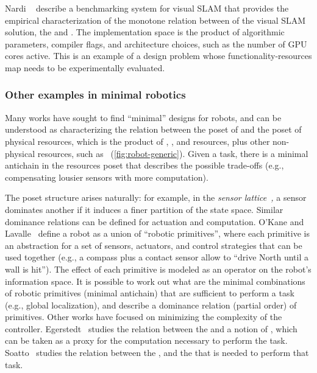 \begin{example}
Nardi\,\,\etal~\cite{zia16comparative} describe a benchmarking
system for visual SLAM that provides the empirical characterization
of the monotone relation between  of the visual
SLAM solution, the  and . The implementation space is the product
of algorithmic parameters, compiler flags, and architecture choices,
such as the number of GPU cores active. This is an example of a design
problem whose functionality-resources map needs to be experimentally
evaluated.
\end{example}

\subsubsection{Other examples in minimal robotics}

Many works have sought to find ``minimal'' designs for robots, and
can be understood as characterizing the relation between the poset
of  and the poset of physical resources, which is the product
of , , and  resources,
plus other non-physical resources, such as ~(\cref{fig:robot-generic}).
Given a task, there is a minimal antichain in the resources poset
that describes the possible trade-offs (e.g., compensating lousier
sensors with more computation). 


The poset structure arises naturally: for example, in the \emph{sensor
lattice}~\cite{lavalle12sensing}\emph{,} a sensor dominates another
if it induces a finer partition of the state space. Similar dominance
relations can be defined for actuation and computation. O'Kane and
Lavalle~\cite{okane08comparing} define a robot as a union of ``robotic
primitives'', where each primitive is an abstraction for a set of
sensors, actuators, and control strategies that can be used together
(e.g., a compass plus a contact sensor allow to ``drive North until
a wall is hit''). The effect of each primitive is modeled as an operator
on the robot's information space. It is possible to work out what
are the minimal combinations of robotic primitives (minimal antichain)
that are sufficient to perform a task (e.g., global localization),
and describe a dominance relation (partial order) of primitives. Other
works have focused on minimizing the complexity of the controller.
Egerstedt~\cite{egerstedt03motion} studies the relation between
the  and a notion of , which can be taken as
a proxy for the computation necessary to perform the task. Soatto~\cite{soatto11steps}
studies the relation between the ,
and the  that is needed to perform that
task. 





